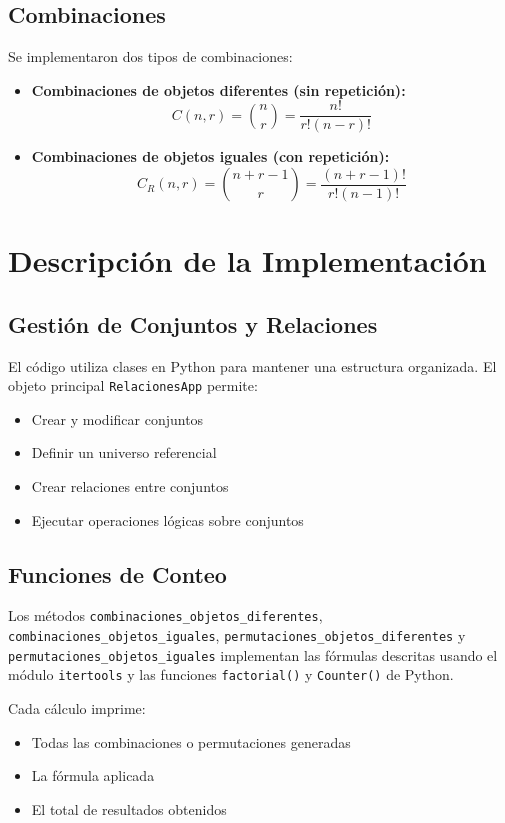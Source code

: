 \documentclass[12pt]{article}
\begin{document}
\subsection{Combinaciones}
Se implementaron dos tipos de combinaciones:

\begin{itemize}
    \item \textbf{Combinaciones de objetos diferentes (sin repetición):}
    \[
        C(n,r) = \binom{n}{r} = \frac{n!}{r!(n-r)!}
    \]
    
    \item \textbf{Combinaciones de objetos iguales (con repetición):}
    \[
        C_R(n,r) = \binom{n+r-1}{r} = \frac{(n+r-1)!}{r!(n-1)!}
    \]
\end{itemize}

\section{Descripción de la Implementación}
\subsection{Gestión de Conjuntos y Relaciones}
El código utiliza clases en Python para mantener una estructura organizada.  
El objeto principal \texttt{RelacionesApp} permite:
\begin{itemize}
    \item Crear y modificar conjuntos
    \item Definir un universo referencial
    \item Crear relaciones entre conjuntos
    \item Ejecutar operaciones lógicas sobre conjuntos
\end{itemize}

\subsection{Funciones de Conteo}
Los métodos \texttt{combinaciones\_objetos\_diferentes}, 
\texttt{combinaciones\_objetos\_iguales}, 
\texttt{permutaciones\_objetos\_diferentes} y 
\texttt{permutaciones\_objetos\_iguales} implementan las fórmulas descritas usando el módulo \texttt{itertools} y las funciones \texttt{factorial()} y \texttt{Counter()} de Python.

Cada cálculo imprime:
\begin{itemize}
    \item Todas las combinaciones o permutaciones generadas
    \item La fórmula aplicada
    \item El total de resultados obtenidos
\end{itemize}
\end{document}
